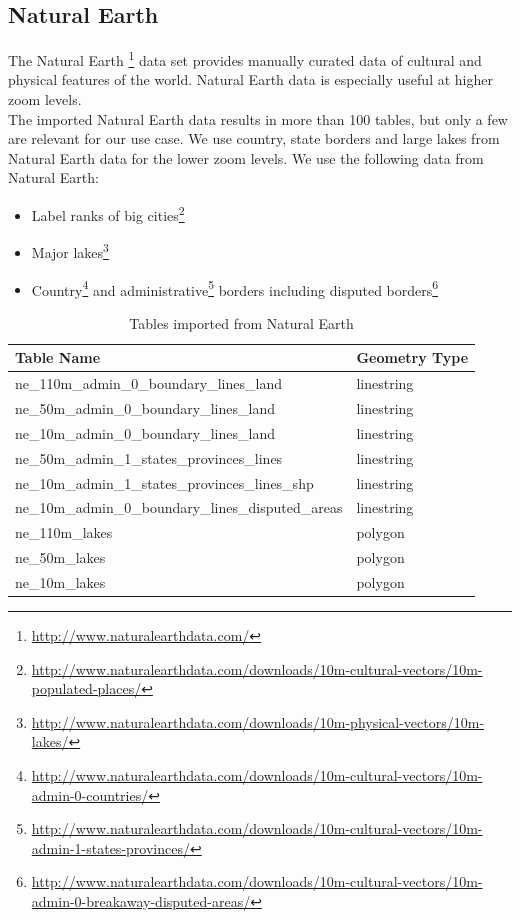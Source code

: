 \newpage
\subsection{Natural Earth}

The Natural Earth \footnote{\url{http://www.naturalearthdata.com/}} data set provides manually curated data of cultural and physical features of the world. Natural Earth data is especially useful at higher zoom levels.
\\
The imported Natural Earth data results in more than 100 tables, but only a few
are relevant for our use case.
We use country, state borders and large lakes from Natural Earth data for the lower zoom
levels.
We use the following data from Natural Earth:

\begin{itemize}
\item Label ranks of big cities\footnote{\url{http://www.naturalearthdata.com/downloads/10m-cultural-vectors/10m-populated-places/}}
\item Major lakes\footnote{\url{http://www.naturalearthdata.com/downloads/10m-physical-vectors/10m-lakes/}}
\item Country\footnote{\url{http://www.naturalearthdata.com/downloads/10m-cultural-vectors/10m-admin-0-countries/}} and administrative\footnote{\url{http://www.naturalearthdata.com/downloads/10m-cultural-vectors/10m-admin-1-states-provinces/}} borders including disputed borders\footnote{\url{http://www.naturalearthdata.com/downloads/10m-cultural-vectors/10m-admin-0-breakaway-disputed-areas/}}
\end{itemize}



\begin{table}[H]
    \begin{tabular}{ll}
    \hline
    Table Name                                          & Geometry Type \\
    \hline
    ne\_110m\_admin\_0\_boundary\_lines\_land           & linestring    \\
    ne\_50m\_admin\_0\_boundary\_lines\_land            & linestring    \\
    ne\_10m\_admin\_0\_boundary\_lines\_land            & linestring    \\
    ne\_50m\_admin\_1\_states\_provinces\_lines         & linestring    \\
    ne\_10m\_admin\_1\_states\_provinces\_lines\_shp    & linestring    \\
    ne\_10m\_admin\_0\_boundary\_lines\_disputed\_areas & linestring    \\
    ne\_110m\_lakes                                     & polygon       \\
    ne\_50m\_lakes                                      & polygon       \\
    ne\_10m\_lakes                                      & polygon       \\
    \end{tabular}
    \caption{Tables imported from Natural Earth}
\end{table}

